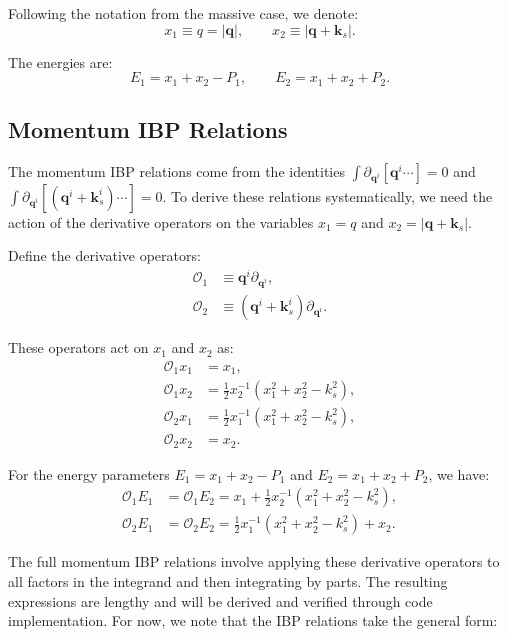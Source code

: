\documentclass[a4paper,12pt]{article}
\def\pd{\partial}
\begin{document}
Following the notation from the massive case, we denote:
\begin{equation}
	x_1 \equiv q = |\bm q|, \qquad x_2 \equiv |\bm q+\bm k_s|.
\end{equation}

The energies are:
\begin{equation}
	E_1 = x_1 + x_2 - P_1, \qquad E_2 = x_1 + x_2 + P_2.
\end{equation}

\subsection{Momentum IBP Relations}

The momentum IBP relations come from the identities $\int \pd_{\bm q^i} [\bm q^i \cdots] = 0$ and $\int \pd_{\bm q^i} [(\bm q^i + \bm k_s^i) \cdots] = 0$. To derive these relations systematically, we need the action of the derivative operators on the variables $x_1 = q$ and $x_2 = |\bm q + \bm k_s|$.

Define the derivative operators:
\begin{align}
	\mathcal{O}_1 & \equiv \bm q^i \pd_{\bm q^i},               \\
	\mathcal{O}_2 & \equiv (\bm q^i + \bm k_s^i) \pd_{\bm q^i}.
\end{align}

These operators act on $x_1$ and $x_2$ as:
\begin{align}
	\mathcal{O}_1 x_1 & = x_1,                                        \\
	\mathcal{O}_1 x_2 & = \frac{1}{2}x_2^{-1}(x_1^2 + x_2^2 - k_s^2), \\
	\mathcal{O}_2 x_1 & = \frac{1}{2}x_1^{-1}(x_1^2 + x_2^2 - k_s^2), \\
	\mathcal{O}_2 x_2 & = x_2.
\end{align}

For the energy parameters $E_1 = x_1 + x_2 - P_1$ and $E_2 = x_1 + x_2 + P_2$, we have:
\begin{align}
	\mathcal{O}_1 E_1 & = \mathcal{O}_1 E_2 = x_1 + \frac{1}{2}x_2^{-1}(x_1^2 + x_2^2 - k_s^2), \\
	\mathcal{O}_2 E_1 & = \mathcal{O}_2 E_2 = \frac{1}{2}x_1^{-1}(x_1^2 + x_2^2 - k_s^2) + x_2.
\end{align}

The full momentum IBP relations involve applying these derivative operators to all factors in the integrand and then integrating by parts. The resulting expressions are lengthy and will be derived and verified through code implementation. For now, we note that the IBP relations take the general form:
\end{document}
